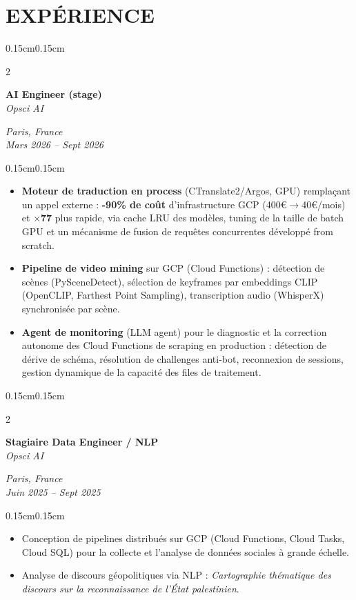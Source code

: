 \documentclass[9pt,letterpaper]{extarticle}
\newenvironment{highlights}{
  \begin{itemize}
}{
  \end{itemize}
}
\newenvironment{onecolentry}{
  \begin{adjustwidth}{0.15cm}{0.15cm}
}{
  \end{adjustwidth}
}
\newenvironment{twocolentry}[2][]{
  \begin{onecolentry}
  \def\secondColumn{#2}
  \setcolumnwidth{\fill, 4.1cm}
  \begin{paracol}{2}
}{
  \switchcolumn \raggedleft \secondColumn
  \end{paracol}
  \end{onecolentry}
}
\begin{document}
\vspace{0.10cm}
\section{EXPÉRIENCE}

\begin{twocolentry}{
\textit{Paris, France} \\
\textit{Mars 2026 – Sept 2026}}
  \textbf{AI Engineer (stage)} \\
  \textit{Opsci AI}
\end{twocolentry}
\vspace{0.04cm}
\begin{onecolentry}
  \begin{highlights}
    \item \textbf{Moteur de traduction en process} (CTranslate2/Argos, GPU) remplaçant un appel externe : \textbf{-90\% de coût} d’infrastructure GCP (400€$\rightarrow$40€/mois) et \textbf{$\times$77} plus rapide, via cache LRU des modèles, tuning de la taille de batch GPU et un mécanisme de fusion de requêtes concurrentes développé from scratch.
    \item \textbf{Pipeline de video mining} sur GCP (Cloud Functions) : détection de scènes (PySceneDetect), sélection de keyframes par embeddings CLIP (OpenCLIP, Farthest Point Sampling), transcription audio (WhisperX) synchronisée par scène.
    \item \textbf{Agent de monitoring} (LLM agent) pour le diagnostic et la correction autonome des Cloud Functions de scraping en production : détection de dérive de schéma, résolution de challenges anti-bot, reconnexion de sessions, gestion dynamique de la capacité des files de traitement.
  \end{highlights}
\end{onecolentry}

\vspace{0.15cm}

\begin{twocolentry}{
\textit{Paris, France} \\
\textit{Juin 2025 – Sept 2025}}
  \textbf{Stagiaire Data Engineer / NLP} \\
  \textit{Opsci AI}
\end{twocolentry}
\vspace{0.04cm}
\begin{onecolentry}
  \begin{highlights}
    \item Conception de pipelines distribués sur GCP (Cloud Functions, Cloud Tasks, Cloud SQL) pour la collecte et l’analyse de données sociales à grande échelle.
    \item Analyse de discours géopolitiques via NLP : \textit{Cartographie thématique des discours sur la reconnaissance de l’État palestinien}.
  \end{highlights}
\end{onecolentry}
\end{document}
